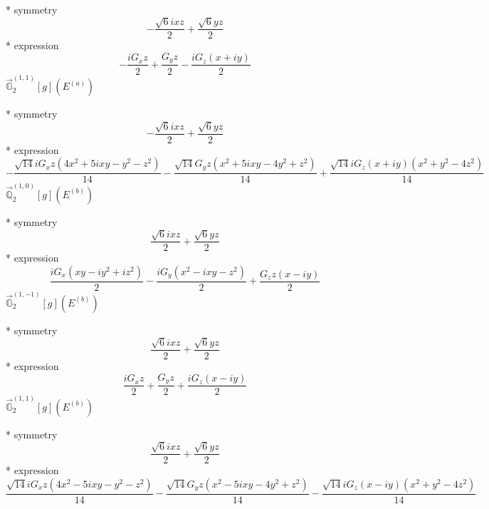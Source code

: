 \documentclass[fleqn,8pt]{jsarticle}
\begin{document}
\noindent\quad ** symmetry
\begin{dmath*}
- \frac{\sqrt{6} i x z}{2} + \frac{\sqrt{6} y z}{2}
\end{dmath*}
\noindent\quad ** expression
\begin{dmath*}
- \frac{i G_{x} z}{2} + \frac{G_{y} z}{2} - \frac{i G_{z} \left(x + i y\right)}{2}
\end{dmath*}
\noindent\quad $\vec{\mathbb{G}}_{2}^{(1,1)}[g](E^{(a)})$

\noindent\quad ** symmetry
\begin{dmath*}
- \frac{\sqrt{6} i x z}{2} + \frac{\sqrt{6} y z}{2}
\end{dmath*}
\noindent\quad ** expression
\begin{dmath*}
- \frac{\sqrt{14} i G_{x} z \left(4 x^{2} + 5 i x y - y^{2} - z^{2}\right)}{14} - \frac{\sqrt{14} G_{y} z \left(x^{2} + 5 i x y - 4 y^{2} + z^{2}\right)}{14} + \frac{\sqrt{14} i G_{z} \left(x + i y\right) \left(x^{2} + y^{2} - 4 z^{2}\right)}{14}
\end{dmath*}
\noindent\quad $\vec{\mathbb{Q}}_{2}^{(1,0)}[g](E^{(b)})$

\noindent\quad ** symmetry
\begin{dmath*}
\frac{\sqrt{6} i x z}{2} + \frac{\sqrt{6} y z}{2}
\end{dmath*}
\noindent\quad ** expression
\begin{dmath*}
\frac{i G_{x} \left(x y - i y^{2} + i z^{2}\right)}{2} - \frac{i G_{y} \left(x^{2} - i x y - z^{2}\right)}{2} + \frac{G_{z} z \left(x - i y\right)}{2}
\end{dmath*}
\noindent\quad $\vec{\mathbb{G}}_{2}^{(1,-1)}[g](E^{(b)})$

\noindent\quad ** symmetry
\begin{dmath*}
\frac{\sqrt{6} i x z}{2} + \frac{\sqrt{6} y z}{2}
\end{dmath*}
\noindent\quad ** expression
\begin{dmath*}
\frac{i G_{x} z}{2} + \frac{G_{y} z}{2} + \frac{i G_{z} \left(x - i y\right)}{2}
\end{dmath*}
\noindent\quad $\vec{\mathbb{G}}_{2}^{(1,1)}[g](E^{(b)})$

\noindent\quad ** symmetry
\begin{dmath*}
\frac{\sqrt{6} i x z}{2} + \frac{\sqrt{6} y z}{2}
\end{dmath*}
\noindent\quad ** expression
\begin{dmath*}
\frac{\sqrt{14} i G_{x} z \left(4 x^{2} - 5 i x y - y^{2} - z^{2}\right)}{14} - \frac{\sqrt{14} G_{y} z \left(x^{2} - 5 i x y - 4 y^{2} + z^{2}\right)}{14} - \frac{\sqrt{14} i G_{z} \left(x - i y\right) \left(x^{2} + y^{2} - 4 z^{2}\right)}{14}
\end{dmath*}
\end{document}
